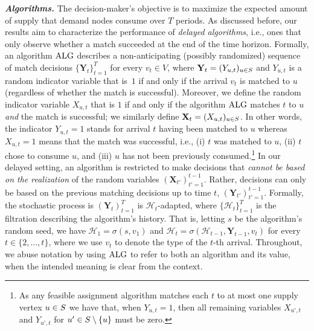 \textbf{\emph{Algorithms.}}
The decision-maker's objective is to maximize the expected amount of supply that demand nodes consume over $T$ periods. As discussed before, our results aim to characterize the performance of \emph{delayed algorithms},
i.e., ones that only observe whether a match succeeded at the end of the time horizon. 
Formally, an algorithm $\mathrm{ALG}$ describes a non-anticipating (possibly randomized) sequence of match decisions $\{
\mathbf{Y}_t
\}^T_{t
=1} $ for every $v_t\in V$, where $\mathbf{Y}_t
=(Y_{u,t})_{u \in S}$  and $Y_{u,t}$ is a random indicator variable that is~$1$ if and only if the arrival $v_t$ is matched to $u$ (regardless of whether the match is successful). Moreover, we define the random indicator variable $X_{u,t}$ that is $1$ if and only if the algorithm $\mathrm{ALG}$  matches $t$ to $u$ \emph{and} the match is successful; we similarly define $\mathbf{X}_t
=(X_{u,t})_{u \in S}$. In other words, the indicator $Y_{u,t}=1$ stands for arrival $t$  having been matched to $u$ whereas $X_{u,t} = 1$ means that the match was successful, i.e., (i) $t$ was matched to $u$, (ii) $t$ chose to consume $u$, and (iii) $u$ has not been previously consumed.\footnote{As any feasible assignment algorithm matches each $t$ to at most one supply vertex $u\in S$ we have that, when $Y_{u,t}=1$, then  all remaining variables $X_{u',t}$ and $Y_{u',t}$ for $u' \in S\setminus\{u\}$ must be zero.} In our delayed setting, an algorithm is restricted to make decisions that \textit{cannot be based on the realization} of the random variables $(\mathbf{X}_{t'})_{t'=1}^{t-1}$. Rather, decisions can only be based on the previous matching decisions up to time $t$, $(\mathbf{Y}_{t'})_{t'=1}^{t-1}$. Formally, the stochastic process is $(\mathbf{Y}_{t})_{t=1}^{T}$ is $\mathcal{H}_t$-adapted,
where $\{\mathcal{H}_t\}_{t=1}^T$ is the filtration describing the algorithm's history. That is, letting $s$ be the algorithm's random
seed, we have $\mathcal{H}_1=\sigma(s, v_1)$ and  $\mathcal{H}_t=\sigma(\mathcal{H}_{t-1}, \mathbf{Y}_{t-1},  v_t)$ for every $t \in \{2, \ldots, t\}$,  where we use $v_t$ to denote the type of the $t$-th arrival. Throughout, we abuse notation by using $\mathrm{ALG}$ to refer to both an algorithm and its value, when the intended meaning is clear from the context.

